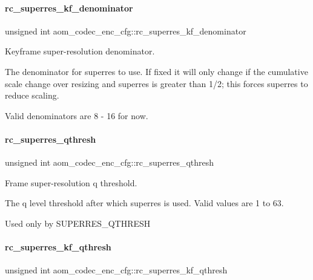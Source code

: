 \paragraph{\texorpdfstring{rc\+\_\+superres\+\_\+kf\+\_\+denominator}{rc\_superres\_kf\_denominator}}
{\footnotesize\ttfamily unsigned int aom\+\_\+codec\+\_\+enc\+\_\+cfg\+::rc\+\_\+superres\+\_\+kf\+\_\+denominator}



Keyframe super-\/resolution denominator. 

The denominator for superres to use. If fixed it will only change if the cumulative scale change over resizing and superres is greater than 1/2; this forces superres to reduce scaling.

Valid denominators are 8 -\/ 16 for now. \mbox{\label{structaom__codec__enc__cfg_a64d3517b2cef17cd57ec3f659ad0f2ab}} 
\paragraph{\texorpdfstring{rc\+\_\+superres\+\_\+qthresh}{rc\_superres\_qthresh}}
{\footnotesize\ttfamily unsigned int aom\+\_\+codec\+\_\+enc\+\_\+cfg\+::rc\+\_\+superres\+\_\+qthresh}



Frame super-\/resolution q threshold. 

The q level threshold after which superres is used. Valid values are 1 to 63.

Used only by S\+U\+P\+E\+R\+R\+E\+S\+\_\+\+Q\+T\+H\+R\+E\+SH \mbox{\label{structaom__codec__enc__cfg_adf982eaa83e7bbdeb40f56bfd307cc98}} 
\paragraph{\texorpdfstring{rc\+\_\+superres\+\_\+kf\+\_\+qthresh}{rc\_superres\_kf\_qthresh}}
{\footnotesize\ttfamily unsigned int aom\+\_\+codec\+\_\+enc\+\_\+cfg\+::rc\+\_\+superres\+\_\+kf\+\_\+qthresh}



